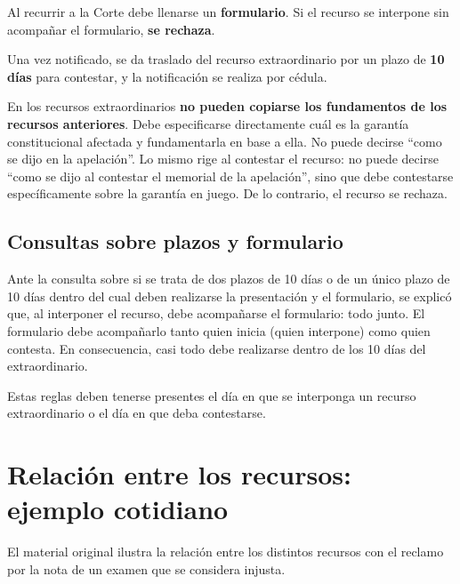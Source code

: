 \documentclass[12pt,oneside]{book}
\begin{document}
\begin{important}
Al recurrir a la Corte debe llenarse un \textbf{formulario}. Si el recurso se interpone sin acompa\~nar el formulario, \textbf{se rechaza}.
\end{important}

Una vez notificado, se da traslado del recurso extraordinario por un plazo de \textbf{10 d\'ias} para contestar, y la notificaci\'on se realiza por c\'edula.

En los recursos extraordinarios \textbf{no pueden copiarse los fundamentos de los recursos anteriores}. Debe especificarse directamente cu\'al es la garant\'ia constitucional afectada y fundamentarla en base a ella. No puede decirse ``como se dijo en la apelaci\'on''. Lo mismo rige al contestar el recurso: no puede decirse ``como se dijo al contestar el memorial de la apelaci\'on'', sino que debe contestarse espec\'ificamente sobre la garant\'ia en juego. De lo contrario, el recurso se rechaza.

\subsection{Consultas sobre plazos y formulario}

Ante la consulta sobre si se trata de dos plazos de 10 d\'ias o de un \'unico plazo de 10 d\'ias dentro del cual deben realizarse la presentaci\'on y el formulario, se explic\'o que, al interponer el recurso, debe acompa\~narse el formulario: todo junto. El formulario debe acompa\~narlo tanto quien inicia (quien interpone) como quien contesta. En consecuencia, casi todo debe realizarse dentro de los 10 d\'ias del extraordinario.

\begin{note}
Estas reglas deben tenerse presentes el d\'ia en que se interponga un recurso extraordinario o el d\'ia en que deba contestarse.
\end{note}

\section{Relaci\'on entre los recursos: ejemplo cotidiano}

El material original ilustra la relaci\'on entre los distintos recursos con el reclamo por la nota de un examen que se considera injusta.
\end{document}
